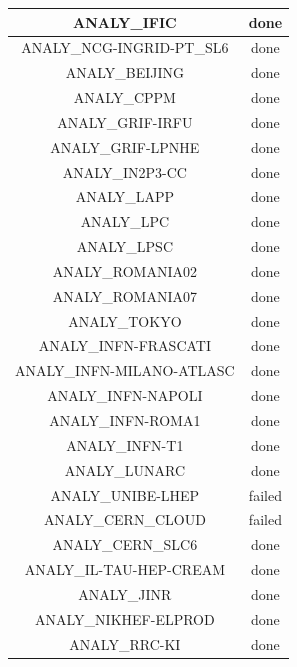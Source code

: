 \begin{longtable}{|c|c|}
	\hline
	\color{black}ANALY\_IFIC & \color{green}done \\
	\hline
	\color{black}ANALY\_NCG-INGRID-PT\_SL6 & \color{green}done \\
	\hline
	\color{black}ANALY\_BEIJING & \color{green}done \\
	\hline
	\color{black}ANALY\_CPPM & \color{green}done \\
	\hline
	\color{black}ANALY\_GRIF-IRFU & \color{green}done \\
	\hline
	\hline
	\color{black}ANALY\_GRIF-LPNHE & \color{green}done \\
	\hline
	\color{black}ANALY\_IN2P3-CC & \color{green}done \\
	\hline
	\color{black}ANALY\_LAPP & \color{green}done \\
	\hline
	\color{black}ANALY\_LPC & \color{green}done \\
	\hline
	\color{black}ANALY\_LPSC & \color{green}done \\
	\hline
	\color{black}ANALY\_ROMANIA02 & \color{green}done \\
	\hline
	\color{black}ANALY\_ROMANIA07 & \color{green}done \\
	\hline
	\color{black}ANALY\_TOKYO & \color{green}done \\
	\hline
	\color{black}ANALY\_INFN-FRASCATI & \color{green}done \\
	\hline
	\color{black}ANALY\_INFN-MILANO-ATLASC & \color{green}done \\
	\hline
	\color{black}ANALY\_INFN-NAPOLI & \color{green}done \\
	\hline
	\color{black}ANALY\_INFN-ROMA1 & \color{green}done \\
	\hline
	\color{black}ANALY\_INFN-T1 & \color{green}done \\
	\hline
	\hline
	\color{black}ANALY\_LUNARC & \color{green}done \\
	\hline
	\color{black}ANALY\_UNIBE-LHEP & \color{red}failed \\
	\hline
	\color{black}ANALY\_CERN\_CLOUD & \color{red}failed \\
	\hline
	\color{black}ANALY\_CERN\_SLC6 & \color{green}done \\
	\hline
	\color{black}ANALY\_IL-TAU-HEP-CREAM & \color{green}done \\
	\hline
	\color{black}ANALY\_JINR & \color{green}done \\
	\hline
	\color{black}ANALY\_NIKHEF-ELPROD & \color{green}done \\
	\hline
	\color{black}ANALY\_RRC-KI & \color{green}done \\

\end{longtable}
